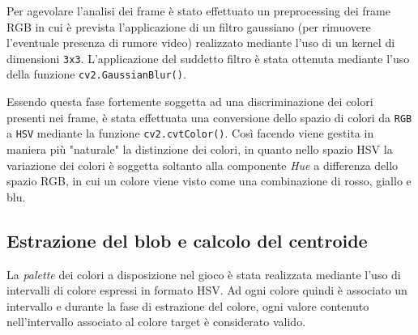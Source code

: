 \begin{figure}[htbp]
	\begin{center}
	\end{center}
\end{figure}

Per agevolare l'analisi dei frame è stato effettuato un preprocessing dei frame RGB in cui è prevista l'applicazione di un filtro gaussiano (per rimuovere l'eventuale presenza di rumore video) realizzato mediante l'uso di un kernel di dimensioni \texttt{3x3}. L'applicazione del suddetto filtro è stata ottenuta mediante l'uso della funzione \texttt{cv2.GaussianBlur()}.

Essendo questa fase fortemente soggetta ad una discriminazione dei colori presenti nei frame, è stata effettuata una conversione dello spazio di colori da \texttt{RGB} a \texttt{HSV} mediante la funzione \texttt{cv2.cvtColor()}. Così facendo viene gestita in maniera più "naturale" la distinzione dei colori, in quanto nello spazio HSV la variazione dei colori è soggetta soltanto alla componente {\itshape Hue} a differenza dello spazio RGB, in cui un colore viene visto come una combinazione di rosso, giallo e blu.

\subsection{Estrazione del blob e calcolo del centroide}
La {\itshape palette} dei colori a disposizione nel gioco è stata realizzata mediante l'uso di intervalli di colore espressi in formato HSV. Ad ogni colore quindi è associato un intervallo e durante la fase di estrazione del colore, ogni valore contenuto nell'intervallo associato al colore target è considerato valido.

